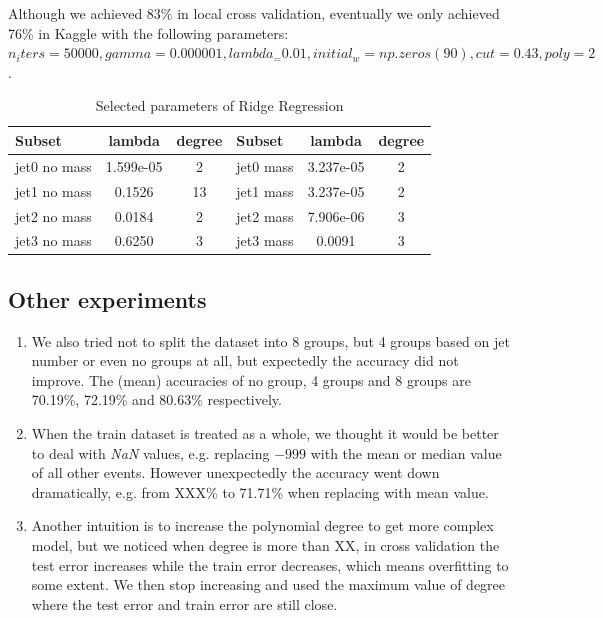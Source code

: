 \documentclass[10pt,conference,compsocconf]{IEEEtran}
\begin{document}
Although we achieved 83\% in local cross validation, eventually we only achieved 76\% in Kaggle with the following parameters: $n_iters = 50000, gamma = 0.000001, lambda_ = 0.01, initial_w = np.zeros(90), cut = 0.43, poly = 2$.

\begin{table}[htbp]
  \centering
  \begin{tabular}[c]{| l | c | c || l | c | c |}
    \hline
    Subset       & lambda & degree & Subset     & lambda      & degree \\
    \hline
    \hline 
    jet0 no mass & 1.599e-05  & 2  & jet0 mass  & 3.237e-05  & 2  \\
    jet1 no mass & 0.1526     & 13 & jet1 mass  & 3.237e-05  & 2  \\
    jet2 no mass & 0.0184     & 2  & jet2 mass  & 7.906e-06  & 3  \\
    jet3 no mass & 0.6250     & 3  & jet3 mass  & 0.0091     & 3  \\
    \hline
  \end{tabular}
  \caption{Selected parameters of Ridge Regression}
  \label{tab:param}
\end{table}

\subsection{Other experiments}
\begin{enumerate}
\item We also tried not to split the dataset into 8 groups, but 4 groups based on jet number or even no groups at all, but expectedly the accuracy did not improve. The (mean) accuracies of no group, 4 groups and 8 groups are 70.19\%, 72.19\% and 80.63\% respectively.
\item When the train dataset is treated as a whole, we thought it would be better to deal with \textit{NaN} values, e.g. replacing $-999$ with the mean or median value of all other events. However unexpectedly the accuracy went down dramatically, e.g. from XXX\% to 71.71\% when replacing with mean value.
\item Another intuition is to increase the polynomial degree to get more complex model, but we noticed when degree is more than {\color{red}XX}, in cross validation the test error increases while the train error decreases, which means overfitting to some extent. We then stop increasing and used the maximum value of degree where the test error and train error are still close. 
\end{enumerate}
\end{document}

